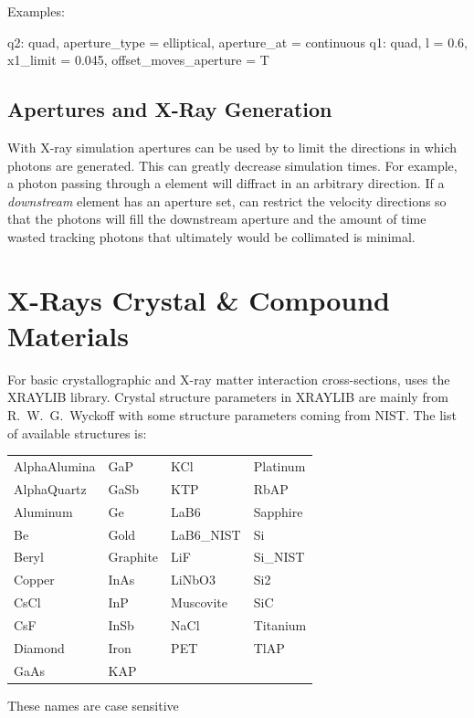 Examples:
\begin{example}
  q2: quad, aperture_type = elliptical, aperture_at = continuous
  q1: quad, l = 0.6, x1_limit = 0.045, offset_moves_aperture = T
\end{example}

\subsection{Apertures and X-Ray Generation}
\label{s:aper.x.ray}

With X-ray simulation apertures can be used by \bmad to limit the directions in which photons are
generated. This can greatly decrease simulation times. For example, a photon passing through a
 element will diffract in an arbitrary direction. If a {\em downstream}
element has an aperture set, \bmad can restrict the velocity directions so that the photons will
fill the downstream aperture and the amount of time wasted tracking photons that ultimately would be
collimated is minimal.

\section{X-Rays Crystal \& Compound Materials}
\label{s:cryst.list}

For basic crystallographic and X-ray matter interaction cross-sections, \bmad uses the
XRAYLIB\cite{b:xraylib} library. Crystal structure parameters in XRAYLIB are mainly from
R.~W.~G.~Wyckoff\cite{b:wyckoff} with some structure parameters coming from NIST. The list of
available structures is:
\begin{center}
\begin{tabular}{llll} \toprule
AlphaAlumina & GaP       & KCl        & Platinum  \\
AlphaQuartz  & GaSb      & KTP        & RbAP      \\
Aluminum     & Ge        & LaB6       & Sapphire  \\
Be           & Gold      & LaB6_NIST  & Si        \\
Beryl        & Graphite  & LiF        & Si_NIST   \\
Copper       & InAs      & LiNbO3     & Si2       \\
CsCl         & InP       & Muscovite  & SiC       \\
CsF          & InSb      & NaCl       & Titanium  \\
Diamond      & Iron      & PET        & TlAP      \\
GaAs         & KAP       &            &           \\ \bottomrule
\end{tabular}
\end{center}
These names are case sensitive

